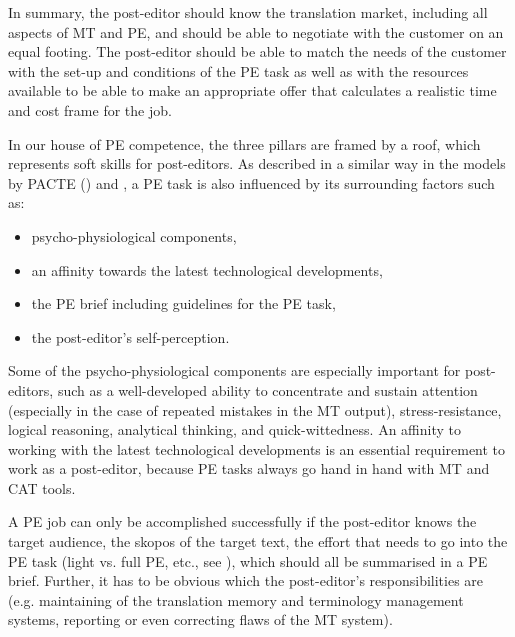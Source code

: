 In summary, the post-editor should know the translation market, including all aspects of MT and PE, and should be able to negotiate with the customer on an equal footing. The post-editor should be able to match the needs of the customer with the set-up and conditions of the PE task as well as with the resources available to be able to make an appropriate offer that calculates a realistic time and cost frame for the job.

\bigskip

In our house of PE competence, the three pillars are framed by a roof, which represents soft skills for post-editors. As described in a similar way in the models by PACTE (\citeyear{beeby2003building}) and \citet{robert2017towards}, a PE task is also influenced by its surrounding factors such as:

\begin{itemize}
 \item psycho-physiological components, 
 \item an affinity towards the latest technological developments,
 \item the PE brief including guidelines for the PE task,
 \item the post-editor’s self-perception.
\end{itemize}{}

Some of the psycho-physiological components are especially important for post-editors, such as a well-developed ability to concentrate and sustain attention (especially in the case of repeated mistakes in the MT output), stress-resistance, logical reasoning, analytical thinking, and quick-wittedness. An affinity to working with the latest technological developments is an essential requirement to work as a post-editor, because PE tasks always go hand in hand with MT and CAT tools.

A PE job can only be accomplished successfully if the post-editor knows the target audience, the skopos of the target text, the effort that needs to go into the PE task (light vs. full PE, etc., see ), which should all be summarised in a PE brief. Further, it has to be obvious which the post-editor's responsibilities are (e.g. maintaining of the translation memory and terminology management systems, reporting or even correcting flaws of the MT system).

